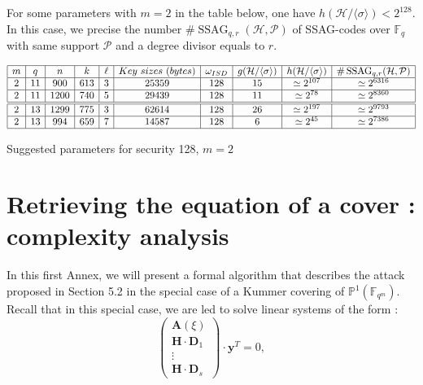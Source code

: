 \documentclass[10pt]{article}
\theoremstyle{definition}
\theoremstyle{definition}
\theoremstyle{definition}
\newcommand{\s}{\vspace{0.3cm}}
\newcommand{\cd}{\cdot}
\newcommand{\PP}{\mathbb{P}}
\newcommand{\calH}{\mathcal{H}}
\newcommand{\fqm}{\mathbb{F}_{q^m}}
\newcommand{\fq}{\mathbb{F}_q}
\newcommand{\w}{\omega}
\newcommand{\PR}{\mathcal{P}}
\newcommand{\ssag}{\operatorname{SSAG}}
\begin{document}
\s

For some parameters with $m=2$ in the table below, one have $h(\calH/\langle \sigma \rangle) < 2^{128}$. In this case, we precise the number $\#\ssag_{q,r}(\mathcal{H},\PR)$ of SSAG-codes over $\fq$ with same support $\PR$ and a degree divisor equals to $r$.

\s


\begin{table}[htbp]
\begin{equation*}
\begin{array}{|c|c|c|c|c|c|c|c|c|c|}
\hline
m & q  & n & k & \ell & Key \ sizes \ (bytes) & \w_{ISD} & g(\calH/\langle \sigma \rangle) & h(\calH/\langle \sigma \rangle) & \#\ssag_{q,r}(\mathcal{H},\PR)  \\
\hline
2 & 11  & 900 & 613 & 3 & 25359 & 128 & 15 & \simeq 2^{107} & \simeq 2^{6316} \\
\hline
2 & 11  & 1200 & 740 & 5 & 29439 & 128 & 11 & \simeq 2^{78} & \simeq 2^{8360}\\
\hline \hline
2 & 13  & 1299 & 775 & 3 & 62614 & 128 & 26 & \simeq 2^{197} & \simeq 2^{9793}\\
\hline
2 & 13 & 994 & 659 & 7 & 14587 & 128 & 6 & \simeq 2^{45} & \simeq 2^{7386}\\
\hline
\end{array}
\end{equation*}
\caption{Suggested parameters for security 128, $m = 2$}
\end{table}


\newpage

\appendix

\section{Retrieving the equation of a cover : complexity analysis} \label{annexA}

\s

In this first Annex, we will present a formal algorithm that describes the attack proposed in Section 5.2 in the special case of a Kummer covering of $\PP^1(\fqm)$. Recall that in this special case, we are led to solve linear systems of the form :
\begin{equation} \tag{$\Delta(\xi)$}
\begin{pmatrix}
\mathbf{A}(\xi) \\
\mathbf{H} \cd \textbf{D}_1 \\
\vdots \\
\mathbf{H} \cd \textbf{D}_s
\end{pmatrix}
\cd \textbf{y}^T = 0,
\end{equation}
\s
\end{document}
